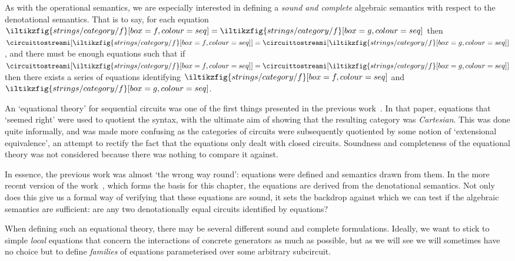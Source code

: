 As with the operational semantics, we are especially interested in defining a
\emph{sound and complete} algebraic semantics with respect to the denotational
semantics.
That is to say, for each equation \(
\iltikzfig{strings/category/f}[box=f,colour=seq]
=
\iltikzfig{strings/category/f}[box=g,colour=seq]
\) then \(
\circuittostreami[\iltikzfig{strings/category/f}[box=f,colour=seq]]
=
\circuittostreami[\iltikzfig{strings/category/f}[box=g,colour=seq]]
\), and there must be enough equations such that if \(
\circuittostreami[\iltikzfig{strings/category/f}[box=f,colour=seq]]
=
\circuittostreami[\iltikzfig{strings/category/f}[box=g,colour=seq]]
\) then there exists a series of equations identifying \(
\iltikzfig{strings/category/f}[box=f,colour=seq]
\) and \(
\iltikzfig{strings/category/f}[box=g,colour=seq]
\).

\begin{remark}
    An `equational theory' for sequential circuits was one of the first things
    presented in the previous
    work~\cite{ghica2016categorical,ghica2017diagrammatic}.
    In that paper, equations that `seemed right' were used to quotient the
    syntax, with the ultimate aim of showing that the resulting category was
    \emph{Cartesian}.
    This was done quite informally, and was made more confusing as
    the categories of circuits were subsequently quotiented by some notion of
    `extensional equivalence', an attempt to rectify the fact that the
    equations only dealt with closed circuits.
    Soundness and completeness of the equational theory was not considered
    because there was nothing to compare it against.

    In essence, the previous work was almost `the wrong way round': equations
    were defined and semantics drawn from them.
    In the more recent version of the work~\cite[Sec.\ 5]{ghica2024fully}, which
    forms the basis for this chapter, the equations are derived from the
    denotational semantics.
    Not only does this give us a formal way of verifying that these equations
    are sound, it sets the backdrop against which we can test if the algebraic
    semantics are sufficient: are any two denotationally equal circuits
    identified by equations?

\end{remark}

When defining such an equational theory, there may be several different sound
and complete formulations.
Ideally, we want to stick to simple \emph{local} equations that concern the
interactions of concrete generators as much as possible, but as we will see
we will sometimes have no choice but to define \emph{families} of equations
parameterised over some arbitrary subcircuit.






